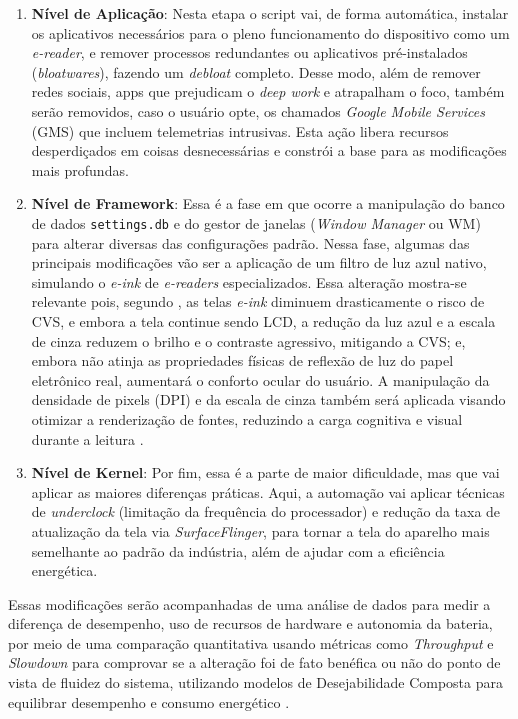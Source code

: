 \documentclass[
    12pt,
    openright,
    oneside,
    a4paper,
    english,
    brazilian
    ]{abntex2}
\begin{document}
\begin{enumerate}
    \item \textbf{Nível de Aplicação}: Nesta etapa o script vai, de forma automática, instalar os aplicativos necessários para o pleno funcionamento do dispositivo como um \textit{e-reader}, e remover processos redundantes ou aplicativos pré-instalados (\textit{bloatwares}), fazendo um \textit{debloat} completo. Desse modo, além de remover redes sociais, apps que prejudicam o \textit{deep work} e atrapalham o foco, também serão removidos, caso o usuário opte, os chamados \textit{Google Mobile Services} (GMS) que incluem telemetrias intrusivas. Esta ação libera recursos desperdiçados em coisas desnecessárias e constrói a base para as modificações mais profundas.
    
    \item \textbf{Nível de Framework}: Essa é a fase em que ocorre a manipulação do banco de dados \texttt{settings.db} e do gestor de janelas (\textit{Window Manager} ou WM) para alterar diversas das configurações padrão. Nessa fase, algumas das principais modificações vão ser a aplicação de um filtro de luz azul nativo, simulando o \textit{e-ink} de \textit{e-readers} especializados. Essa alteração mostra-se relevante pois, segundo , as telas \textit{e-ink} diminuem drasticamente o risco de CVS, e embora a tela continue sendo LCD, a redução da luz azul e a escala de cinza reduzem o brilho e o contraste agressivo, mitigando a CVS; e, embora não atinja as propriedades físicas de reflexão de luz do papel eletrônico real, aumentará o conforto ocular do usuário. A manipulação da densidade de pixels (DPI) e da escala de cinza também será aplicada visando otimizar a renderização de fontes, reduzindo a carga cognitiva e visual durante a leitura \cite{sa2016, android2025}.
    
    \item \textbf{Nível de Kernel}: Por fim, essa é a parte de maior dificuldade, mas que vai aplicar as maiores diferenças práticas. Aqui, a automação vai aplicar técnicas de \textit{underclock} (limitação da frequência do processador) e redução da taxa de atualização da tela via \textit{SurfaceFlinger}, para tornar a tela do aparelho mais semelhante ao padrão da indústria, além de ajudar com a eficiência energética.
\end{enumerate}

Essas modificações serão acompanhadas de uma análise de dados para medir a diferença de desempenho, uso de recursos de hardware e autonomia da bateria, por meio de uma comparação quantitativa usando métricas como \textit{Throughput} e \textit{Slowdown} para comprovar se a alteração foi de fato benéfica ou não do ponto de vista de fluidez do sistema, utilizando modelos de Desejabilidade Composta para equilibrar desempenho e consumo energético \cite{pontes2017}.
\end{document}
